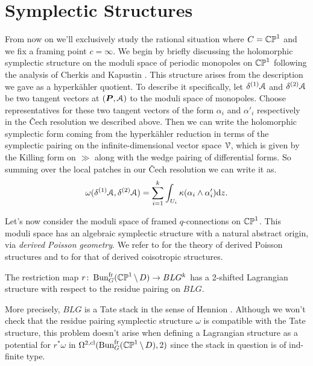 \documentclass[10pt, oneside]{article}
\renewcommand{\d}{\mathrm{d}}
\newcommand{\fr}{\mathrm{fr}}
\begin{document}
\section{Symplectic Structures}
From now on we'll exclusively study the rational situation where $C = \mathbb{CP}^1$ and we fix a framing point $c = \infty$.  We begin by briefly discussing the holomorphic symplectic structure on the moduli space of periodic monopoles on $\mathbb{CP}^1$ following the analysis of Cherkis and Kapustin \cite{CherkisKapustin1, CherkisKapustin3}.  This structure arises from the description we gave as a hyperk\"ahler quotient.  To describe it specifically, let $\delta^{(1)} \mathcal{A}$ and $\delta^{(2)} \mathcal{A}$ be two tangent vectors at $(\boldsymbol{P}, \mathcal{A})$ to the moduli space of monopoles.  Choose representatives for these two tangent vectors of the form $\alpha_i$ and $\alpha'_i$ respectively  in the \v Cech resolution we described above.  Then we can write the holomorphic symplectic form coming from the hyperk\"ahler reduction in terms of the symplectic pairing on the infinite-dimensional vector space $\mathcal{V}$, which is given by the Killing form on $\gg$ along with the wedge pairing of differential forms.  So summing over the local patches in our \v Cech resolution we can write it as.
\[\omega(\delta^{(1)} \mc A, \delta^{(2)} \mc A) = \sum_{i=1}^k \int_{U_i} \kappa(\alpha_i \wedge \alpha'_i) \d z.\]

Let's now consider the moduli space of framed $q$-connections on $\mathbb{CP}^1$.  This moduli space has an algebraic symplectic structure with a natural abstract origin, via \emph{derived Poisson geometry}.  We refer to \cite{CPTVV} for the theory of derived Poisson structures and to \cite{MelaniSafronov1, MelaniSafronov2, Spaide} for that of derived coisotropic structures.

\begin{lemma} \label{restriction_Lagn_lemma}
The restriction map $r \colon \bun_G^\fr(\bb{CP}^1 \! \bs \! D) \to BLG^k$ has a 2-shifted Lagrangian structure with respect to the residue pairing on $BLG$.
\end{lemma}

\begin{remark}
More precisely, $BLG$ is a Tate stack in the sense of Hennion \cite{Hennion}.  Although we won't check that the residue pairing symplectic structure $\omega$ is compatible with the Tate structure, this problem doesn't arise when defining a Lagrangian structure as a potential for $r^*\omega$ in $\Omega^{2,\mr{cl}}(\bun_G^\fr(\bb{CP}^1 \! \bs \! D), 2)$ since the stack in question is of ind-finite type.
\end{remark}
\end{document}
